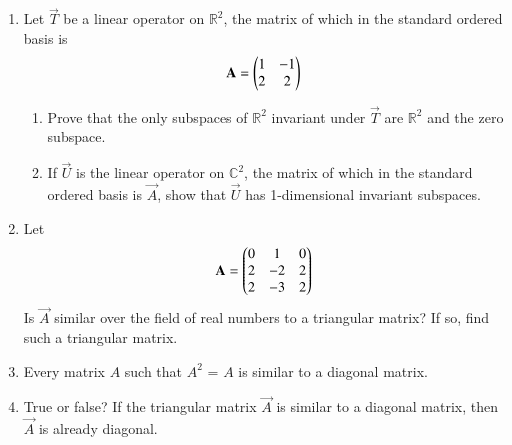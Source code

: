 \renewcommand{\theequation}{\theenumi}
\renewcommand{\thefigure}{\theenumi}
\begin{enumerate}[label=\thesubsection.\arabic*.,ref=\thesubsection.\theenumi]

\item Let $\vec{T}$ be a linear operator on $\mathbb{R}^2$, the matrix of which in the standard ordered basis is
\begin{align}
    \mathbf{A}=\begin{pmatrix}1&-1\\2&2\end{pmatrix}
\end{align}
\begin{enumerate}
    \item Prove that the only subspaces of $\mathbb{R}^2$ invariant under $\vec{T}$ are $\mathbb{R}^2$ and the zero subspace.
    \item If $\vec{U}$ is the linear operator on $\mathbb{C}^2$, the matrix of which in the standard ordered basis is $\vec{A}$, show that $\vec{U}$ has 1-dimensional invariant subspaces.
\end{enumerate}
%
\solution

\item %
Let
\begin{align}
    \Vec{A}=\myvec{0&1&0\\2&-2&2\\2&-3&2}
\end{align}
Is $\vec{A}$ similar over the field of real numbers to a triangular matrix? If so, find such a triangular matrix.
\\
\solution

\twocolumn


\item  Every matrix $A$ such that $A^2$ = $A$ is similar to a diagonal matrix.
%
\\
\solution

\twocolumn
\item True or false? If the triangular matrix $\vec{A}$ is similar to a diagonal matrix, then $\vec{A}$ is already diagonal.
%
\\
\solution

\end{enumerate}
